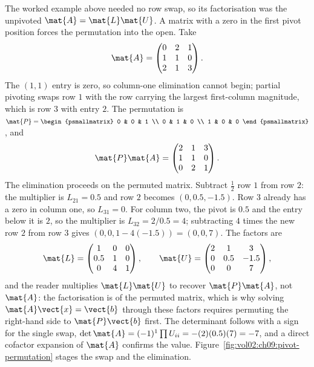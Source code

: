 \begin{example}
The worked example above needed no row swap, so its factorisation was
the unpivoted $\mat{A} = \mat{L}\mat{U}$. A matrix with a zero in the
first pivot position forces the permutation into the open. Take
\[
\mat{A} = \begin{pmatrix} 0 & 2 & 1 \\ 1 & 1 & 0 \\ 2 & 1 & 3
\end{pmatrix}.
\]
The $(1,1)$ entry is zero, so column-one elimination cannot begin;
partial pivoting swaps row $1$ with the row carrying the largest
first-column magnitude, which is row $3$ with entry $2$. The
permutation is $\mat{P} = \begin{psmallmatrix} 0 & 0 & 1 \\ 0 & 1 & 0
\\ 1 & 0 & 0 \end{psmallmatrix}$, and
\[
\mat{P}\mat{A} = \begin{pmatrix} 2 & 1 & 3 \\ 1 & 1 & 0 \\ 0 & 2 & 1
\end{pmatrix}.
\]
The elimination proceeds on the permuted matrix. Subtract
$\tfrac{1}{2}$ row $1$ from row $2$: the
multiplier is $L_{21} = 0.5$ and row $2$ becomes $(0, 0.5, -1.5)$. Row
$3$ already has a zero in column one, so $L_{31} = 0$. For column two,
the pivot is $0.5$ and the entry below it is $2$, so the multiplier is
$L_{32} = 2/0.5 = 4$; subtracting $4$ times the new row $2$ from row
$3$ gives $(0, 0, 1 - 4(-1.5)) = (0, 0, 7)$. The factors are
\[
\mat{L} = \begin{pmatrix} 1 & 0 & 0 \\ 0.5 & 1 & 0 \\ 0 & 4 & 1
\end{pmatrix}, \qquad
\mat{U} = \begin{pmatrix} 2 & 1 & 3 \\ 0 & 0.5 & -1.5 \\ 0 & 0 & 7
\end{pmatrix},
\]
and the reader multiplies $\mat{L}\mat{U}$ to recover $\mat{P}\mat{A}$,
not $\mat{A}$: the factorisation is of the permuted matrix, which is why
solving $\mat{A}\vect{x} = \vect{b}$ through these factors requires
permuting the right-hand side to $\mat{P}\vect{b}$ first. The
determinant follows with a sign for the single swap, $\det\mat{A} =
(-1)^{1}\prod U_{ii} = -(2)(0.5)(7) = -7$, and a direct cofactor
expansion of $\mat{A}$ confirms the value. Figure~\ref{fig:vol02:ch09:pivot-permutation}
stages the swap and the elimination.
\end{example}

